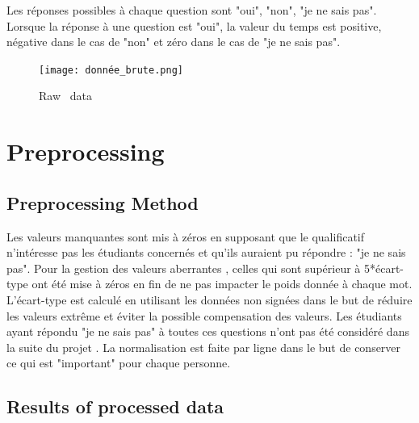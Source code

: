 \documentclass[12pt]{article}
\begin{document}
Les réponses possibles à chaque question sont "oui", "non", "je ne sais pas". Lorsque la réponse à une question est "oui", la valeur du temps est positive, négative dans le cas de "non" et zéro dans le cas de "je ne sais pas".


\begin{figure}[h]
\begin{center}
\texttt{[image: donnée\_brute.png]} 
\caption[]{ Raw \ data}
\end{center}
\end{figure}


\section{Preprocessing}

\subsection{Preprocessing Method}

Les valeurs manquantes sont mis à zéros en supposant que le qualificatif n'intéresse pas les étudiants concernés et qu'ils auraient pu  répondre : "je ne sais pas".
Pour la gestion des valeurs aberrantes , celles qui sont  supérieur à 5*écart-type ont été mise à zéros en fin de ne pas impacter le poids donnée à chaque  mot. L'écart-type est calculé en utilisant les données non signées dans le but de réduire les valeurs extrême et éviter la possible compensation des valeurs.
Les étudiants ayant répondu "je ne sais pas" à toutes ces questions n'ont pas été considéré dans la suite du projet .  
La normalisation est faite par ligne dans le but de conserver ce qui est "important" pour chaque personne. 




\subsection{Results of processed data}
\end{document}
